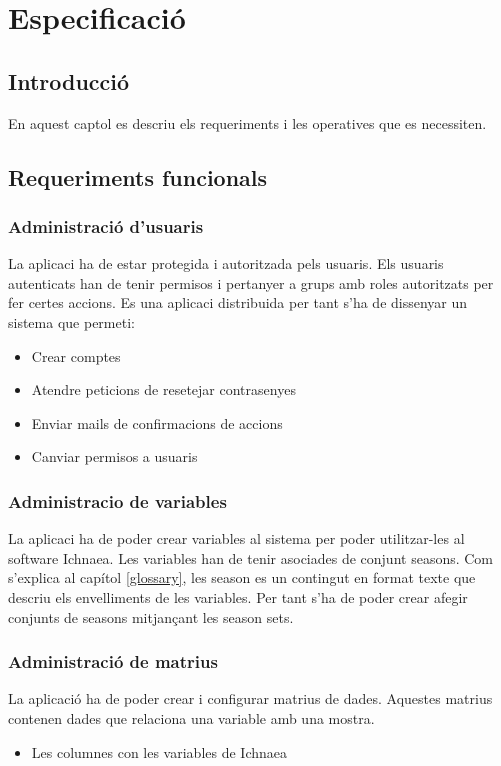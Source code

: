 \chapter{Especificaci\'{o}}
\label{cha:specification}


\section{Introducci\'{o}}
En aquest captol es descriu els requeriments i les operatives que es necessiten.\\


\section{Requeriments funcionals}

\subsection{Administraci\'{o} d'usuaris}
La aplicaci ha de estar protegida i autoritzada pels usuaris. Els usuaris autenticats han de tenir permisos i  pertanyer a grups amb roles autoritzats per fer certes accions. Es una aplicaci distribuida per tant s'ha de dissenyar un sistema que permeti:
\begin{itemize}
\item Crear comptes
\item Atendre peticions de resetejar contrasenyes
\item Enviar mails de confirmacions de accions
\item Canviar permisos a usuaris
\end{itemize}

\subsection{Administracio de variables}
La aplicaci ha de poder crear variables al sistema per poder utilitzar-les al software Ichnaea. Les variables han de tenir asociades de conjunt seasons. Com s'explica al cap\'{i}tol \ref{glossary}, les season es un contingut en format texte que descriu els envelliments de les variables. Per tant s'ha de poder crear afegir conjunts de seasons mitjançant les season sets.\\

\subsection{Administraci\'{o} de matrius}
La aplicaci\'{o} ha de poder crear i configurar matrius de dades. Aquestes matrius contenen dades que relaciona una variable amb una mostra.
\begin{itemize}
\item Les columnes con les variables de Ichnaea
\end{itemize}

